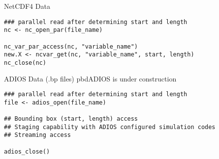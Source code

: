 \begin{frame}[fragile]
  \begin{exampleblock}{NetCDF4 Data}\pause \vspace{-0.8ex}
    \begin{lstlisting}
### parallel read after determining start and length
nc <- nc_open_par(file_name)

nc_var_par_access(nc, "variable_name")
new.X <- ncvar_get(nc, "variable_name", start, length)
nc_close(nc)
    \end{lstlisting}
  \end{exampleblock}
  \begin{exampleblock}{ADIOS Data (.bp files) \hfill pbdADIOS is under
    construction}\pause \vspace{-0.8ex}
    \begin{lstlisting}
### parallel read after determining start and length
file <- adios_open(file_name)

## Bounding box (start, length) access
## Staging capability with ADIOS configured simulation codes
## Streaming access

adios_close()
    \end{lstlisting}
  \end{exampleblock}
\end{frame}

